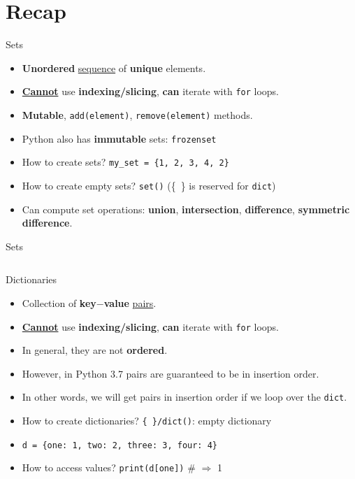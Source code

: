     \section{Recap}
    \begin{frame}{Sets}
        \LARGE
        \begin{itemize}
            \item \textbf{Unordered} \underline{sequence} of \textbf{unique} elements.
            \item \underline{\textbf{Cannot}} use \textbf{indexing/slicing}, \textbf{can} iterate with \texttt{for} loops.
            \item \textbf{Mutable}, \texttt{add(element)}, \texttt{remove(element)} methods.
            \item Python also has \textbf{immutable} sets: \texttt{frozenset}
            \item How to create sets? 
             \texttt{my\_set = \{1, 2, 3, 4, 2\}}
            \item How to create empty sets?
             \texttt{set()} (\{\ \} is reserved for \texttt{dict})
            \item Can compute set operations: \textbf{union}, \textbf{intersection}, \textbf{difference}, \textbf{symmetric difference}.
        \end{itemize}
    \end{frame}
    \begin{frame}{Sets}
        \inputminted[frame=single,framesep=2pt]{python3}{../Lecture5/code-examples/sets.py}
    \end{frame}
    \begin{frame}{Dictionaries}
        \LARGE
        \begin{itemize}
            \item Collection of \textbf{key$-$value} \underline{pairs}.
            \item \underline{\textbf{Cannot}} use \textbf{indexing/slicing}, \textbf{can} iterate with \texttt{for} loops. 
            \item In general, they are not \textbf{ordered}. 
            \item However, in Python 3.7 pairs are guaranteed to be in insertion order.
            \item In other words, we will get pairs in insertion order if we loop over the \texttt{dict}.
            \item How to create dictionaries?
             \texttt{\{\ \}/dict()}: empty dictionary
            \item \texttt{d = \{\textquotesingle one\textquotesingle : 1, \textquotesingle two\textquotesingle : 2, \textquotesingle three\textquotesingle : 3, \textquotesingle four\textquotesingle : 4\}}
            \item How to access values? 
             \texttt{print(d[\textquotesingle one\textquotesingle ])} \# $\Rightarrow$ 1
        \end{itemize}
    \end{frame}


